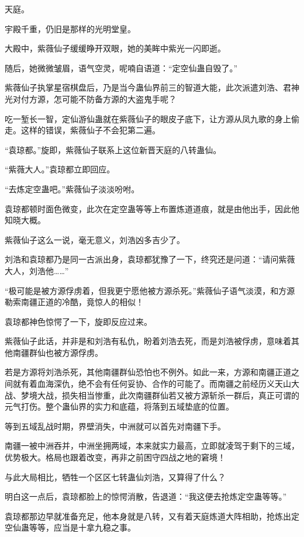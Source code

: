 
\begin{this_body}

天庭。

宇殿千重，仍旧是那样的光明堂皇。

大殿中，紫薇仙子缓缓睁开双眼，她的美眸中紫光一闪即逝。

随后，她微微皱眉，语气空灵，呢喃自语道：“定空仙蛊自毁了。”

紫薇仙子执掌星宿棋盘后，乃是当今蛊仙界前三的智道大能，此次派遣刘浩、君神光对付方源，怎可能不防备方源的大盗鬼手呢？

吃一堑长一智，定仙游仙蛊就在紫薇仙子的眼皮子底下，让方源从凤九歌的身上偷走。这样的错误，紫薇仙子不会犯第二遍。

“袁琼都。”旋即，紫薇仙子联系上这位新晋天庭的八转蛊仙。

“紫薇大人。”袁琼都立即回应。

“去炼定空蛊吧。”紫薇仙子淡淡吩咐。

袁琼都顿时面色微变，此次在定空蛊等等上布置炼道道痕，就是由他出手，因此他知晓大概。

紫薇仙子这么一说，毫无意义，刘浩凶多吉少了。

刘浩和袁琼都乃是同一古派出身，袁琼都犹豫了一下，终究还是问道：“请问紫薇大人，刘浩他……”

“极可能是被方源俘虏着，但我更宁愿他被方源杀死。”紫薇仙子语气淡漠，和方源勒索南疆正道的冷酷，竟惊人的相似！

袁琼都神色惊愕了一下，旋即反应过来。

紫薇仙子此话，并非是和刘浩有私仇，盼着刘浩去死，而是刘浩被俘虏，意味着其他南疆群仙也被方源俘虏。

若是方源将刘浩杀死，其他南疆群仙恐怕也不例外。如此一来，方源和南疆正道之间就有着血海深仇，绝不会有任何妥协、合作的可能了。而南疆之前经历义天山大战、梦境大战，损失相当惨重，此次南疆群仙若又被方源斩杀一群后，真正可谓的元气打伤。整个蛊仙界的实力和底蕴，将落到五域垫底的位置。

等到五域乱战时期，界壁消失，中洲就可以首先对南疆下手。

南疆一被中洲吞并，中洲坐拥两域，本来就实力最高，立即就凌驾于剩下的三域，优势极大。格局也跟着改变，再非之前困守四战之地的窘境！

与此大局相比，牺牲一个区区七转蛊仙刘浩，又算得了什么？

明白这一点后，袁琼都脸上的惊愕消散，告退道：“我这便去抢炼定空蛊等等。”

袁琼都那边早就准备充足，他本身就是八转，又有着天庭炼道大阵相助，抢炼出定空仙蛊等等，应当是十拿九稳之事。


\end{this_body}
